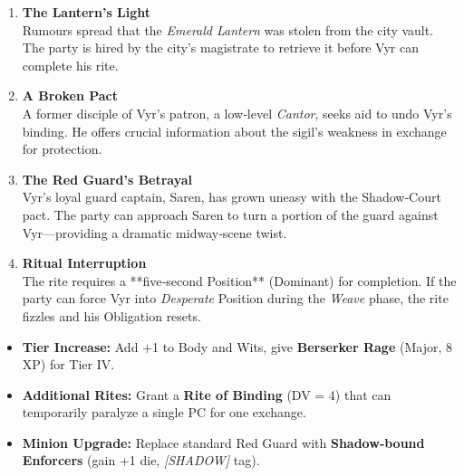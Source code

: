 \documentclass[12pt,a4paper]{article}
\begin{document}
\begin{enumerate}[label=\alph*., leftmargin=*]
    \item \textbf{The Lantern's Light}\\
          Rumours spread that the \emph{Emerald Lantern} was stolen
          from the city vault.  The party is hired by the city's magistrate
          to retrieve it before Vyr can complete his rite.
    \item \textbf{A Broken Pact}\\
          A former disciple of Vyr's patron, a low‑level \emph{Cantor},
          seeks aid to undo Vyr's binding.  He offers crucial information
          about the sigil's weakness in exchange for protection.
    \item \textbf{The Red Guard's Betrayal}\\
          Vyr's loyal guard captain, Saren, has grown uneasy with the
          Shadow‑Court pact.  The party can approach Saren to turn
          a portion of the guard against Vyr---providing a dramatic
          midway‑scene twist.
    \item \textbf{Ritual Interruption}\\
          The rite requires a **five‑second Position** (Dominant) for
          completion.  If the party can force Vyr into \emph{Desperate}
          Position during the \emph{Weave} phase, the rite fizzles and
          his Obligation resets.
\end{enumerate}

\begin{itemize}[leftmargin=*]
    \item \textbf{Tier Increase:} Add +1 to Body and Wits, give \textbf{Berserker Rage}
          (Major, 8 XP) for Tier IV.
    \item \textbf{Additional Rites:} Grant a \textbf{Rite of Binding} (DV = 4) that
          can temporarily paralyze a single PC for one exchange.
    \item \textbf{Minion Upgrade:} Replace standard Red Guard with
          \textbf{Shadow‑bound Enforcers} (gain +1 die, \emph{[SHADOW]} tag).
\end{itemize}
\end{document}
